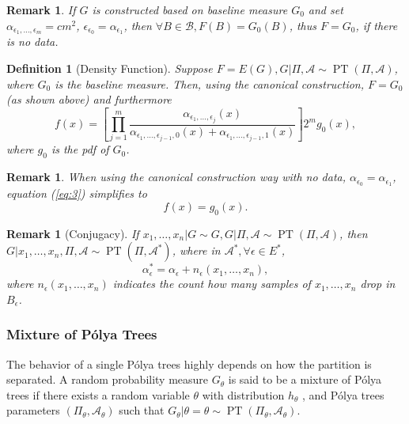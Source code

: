 \documentclass[12pt]{article}
\newtheorem{deff}[thm]{Definition}
\newtheorem{rmk}[thm]{Remark}
\newcommand{\polya}{P\'{o}lya}
\DeclareMathOperator{\pt}{PT}
\begin{document}
\begin{rmk}
If $G$ is constructed based on baseline measure $G_0$ and set
$\alpha_{\epsilon_1, \ldots, \epsilon_m} = cm^2 $,
$\epsilon_{\epsilon_0 }= \alpha_{\epsilon_1}$, then $\forall B \in
\mathcal{B}, F(B) = G_0(B)$, thus $F=G_0$, if there is no
data.
\end{rmk}

\begin{deff}[Density Function]
Suppose $F=E(G), G|\Pi, \mathcal{A} \sim \pt (\Pi, \mathcal{A})$,
where $G_0 $ is the baseline measure. Then, using the canonical
construction, $F=G_0$ (as shown above) and furthermore 
\begin{equation}\label{eq:3}
f(x) = \left[ \prod_{j=1}^m \frac{ \alpha_{\epsilon_1, \ldots,
      \epsilon_j}(x)}{\alpha_{\epsilon_1, \ldots, \epsilon_{j-1},0}(x)
   + \alpha_{\epsilon_1, \ldots, \epsilon_{j-1},1}(x)} \right] 2^{m } g_0(x),
\end{equation}
where $g_0$ is the pdf of $G_0$. 
\end{deff}

\begin{rmk}
When using the canonical construction way with no data,
$\alpha_{\epsilon_0 } = \alpha_{\epsilon_1}$, equation (\ref{eq:3})
simplifies to 
\begin{displaymath}
f(x) = g_0(x).
\end{displaymath}
\end{rmk}

\begin{rmk}[Conjugacy]
If $x_1, \ldots, x_n | G \sim G, G|\Pi, \mathcal{A} \sim \pt (\Pi,
\mathcal{A})$, then $G|x_1, \ldots, x_n , \Pi, \mathcal{A} \sim \pt
(\Pi, \mathcal{A}^{*})$, where in $\mathcal{A}^{*}, \forall \epsilon
\in E^{*}$, 
\begin{displaymath}
\alpha_{\epsilon}^{*} = \alpha_{\epsilon} + n_{\epsilon}(x_1, \ldots, x_n),
\end{displaymath}
where $n_{\epsilon}(x_1, \ldots, x_n)$ indicates the count how many
samples of $x_1, \ldots, x_n$ drop in $B_{\epsilon}$. 
\end{rmk}

\subsubsection{Mixture of \polya{} Trees}
The behavior of a single \polya{} trees highly depends on how the
partition is separated. A random probability measure $G_\theta$ is
said to be a mixture of \polya{} trees if there exists a random
variable $\theta$ with distribution $h_{\theta}$ , and \polya{} trees
parameters $(\Pi_{\theta}, \mathcal{A}_{\theta})$ such that
$G_{\theta} | \theta=\theta \sim \pt (\Pi_{\theta},
\mathcal{A}_{\theta})$.
\end{document}
